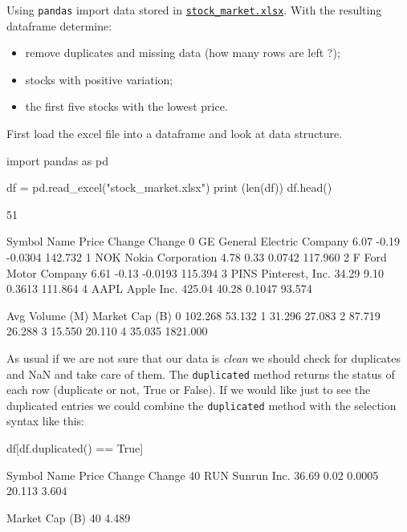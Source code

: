 \begin{question}
Using \texttt{pandas} import data stored in \href{https://drive.google.com/file/d/1Uu9lQorvzM-1xwRKPNszaSqlCYAiY-gr/view?usp=sharing}{\texttt{stock\_market.xlsx}}. With the resulting dataframe determine:
\begin{itemize}
\item remove duplicates and missing data (how many rows are left ?);
\item stocks with positive variation;
\item the first five stocks with the lowest price.
\end{itemize}
\end{question}

\begin{solution}
First load the excel file into a dataframe and look at data structure.
\end{solution}

\begin{ipython}
import pandas as pd

df = pd.read_excel("stock_market.xlsx")
print (len(df))
df.head()

51

  Symbol                      Name   Price  Change  Change%
0     GE  General Electric Company    6.07   -0.19  -0.0304     142.732
1    NOK         Nokia Corporation    4.78    0.33   0.0742     117.960
2      F        Ford Motor Company    6.61   -0.13  -0.0193     115.394
3   PINS           Pinterest, Inc.   34.29    9.10   0.3613     111.864
4   AAPL                Apple Inc.  425.04   40.28   0.1047      93.574

   Avg Volume (M)  Market Cap (B)
0         102.268          53.132
1          31.296          27.083
2          87.719          26.288
3          15.550          20.110
4          35.035        1821.000
\end{ipython}
        
As usual if we are not sure that our data is \emph{clean} we should check for duplicates and NaN and take care of them. The \texttt{duplicated} method returns the status of each row (duplicate or not, True or False). If we would like just to see the duplicated entries we could combine the \texttt{duplicated} method with the selection syntax like this:

\begin{ipython}
df[df.duplicated() == True]

   Symbol         Name  Price  Change  Change%
40    RUN  Sunrun Inc.  36.69    0.02   0.0005      20.113           3.604

    Market Cap (B)
40           4.489
\end{ipython}
        
